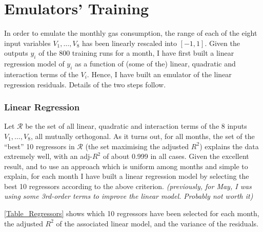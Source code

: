 \documentclass[a4paper, 12pt]{article}
\begin{document}
\section{Emulators' Training}
In order to emulate the monthly gas consumption, the range of each of the eight input variables $V_1, \dots, V_8$ has been linearly rescaled into $[-1,1]$.
Given the outputs $y_i$ of the 800 training runs for a month, 
I have first built a linear regression model of $y_i$ as a function of (some of the) linear, quadratic and interaction terms of the $V_i$.
Hence, I have built an emulator of the linear regression residuals. Details of the two steps follow.

\subsubsection*{Linear Regression}
Let $\mathcal{R}$ be the set of all linear, quadratic and interaction terms of the 8 inputs $V_1, \dots, V_8$, all mutually orthogonal.
As it turns out, for all months, the set of the ``best'' 10 regressors in $\mathcal{R}$ (the set maximising the adjusted $R^2$) explains the data extremely well, 
with an adj-$R^2$ of about 0.999 in all cases. Given the excellent result, and to use an approach which is uniform among months and simple to explain,  
for each month I have built a linear regression model by selecting the best 10 regressors according to the above criterion. 
\emph{(previously, for May, I was using some 3rd-order terms to improve the linear model. Probably not worth it)}

\autoref{Table_Regressors} shows which 10 regressors have been selected for each month, the adjusted $R^2$ of the associated linear model, and the variance of the residuals.
\end{document}
